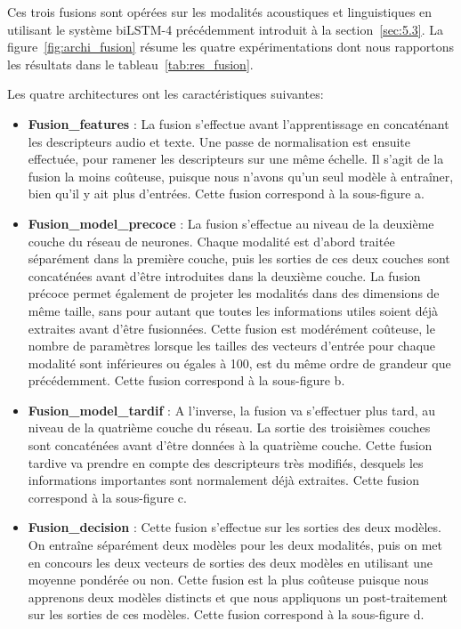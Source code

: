 Ces trois fusions sont opérées sur les modalités acoustiques et linguistiques en utilisant le système biLSTM-4 précédemment introduit à la section~\ref{sec:5.3}. La figure~\ref{fig:archi_fusion} résume les quatre expérimentations dont nous rapportons les résultats dans le tableau~\ref{tab:res_fusion}.



Les quatre architectures ont les caractéristiques suivantes:
\begin{itemize}
  \item \textbf{Fusion\_features} : La fusion s'effectue avant l'apprentissage en concaténant les descripteurs audio et texte. Une passe de normalisation est ensuite effectuée, pour ramener les descripteurs sur une même échelle. Il s'agit de la fusion la moins coûteuse, puisque nous n'avons qu'un seul modèle à entraîner, bien qu'il y ait plus d'entrées. Cette fusion correspond à la sous-figure a.
  \item \textbf{Fusion\_model\_precoce} : La fusion s'effectue  au niveau de la deuxième couche du réseau de neurones. Chaque modalité est d'abord traitée séparément dans la première couche, puis les sorties de ces deux couches sont concaténées avant d'être introduites dans la deuxième couche. La fusion précoce permet également de projeter les modalités dans des dimensions de même taille, sans pour autant que toutes les informations utiles soient déjà extraites avant d'être fusionnées. Cette fusion est modérément coûteuse, le nombre de paramètres lorsque les tailles des vecteurs d'entrée pour chaque modalité sont inférieures ou égales à 100, est du même ordre de grandeur que précédemment. Cette fusion correspond à la sous-figure b.
  \item \textbf{Fusion\_model\_tardif} : A l'inverse, la fusion va s'effectuer plus tard, au niveau de la quatrième couche du réseau. La sortie des troisièmes couches sont concaténées avant d'être données à la quatrième couche. Cette fusion tardive va prendre en compte des descripteurs très modifiés, desquels les informations importantes sont normalement déjà extraites. Cette fusion correspond à la sous-figure c.
  \item \textbf{Fusion\_decision} : Cette fusion s'effectue sur les sorties des deux modèles. On entraîne séparément deux modèles pour les deux modalités, puis on met en concours les deux vecteurs de sorties des deux modèles en utilisant une moyenne pondérée ou non. Cette fusion est la plus coûteuse puisque nous apprenons deux modèles distincts et que nous appliquons un post-traitement sur les sorties de ces modèles. Cette fusion correspond à la sous-figure d.
\end{itemize}


